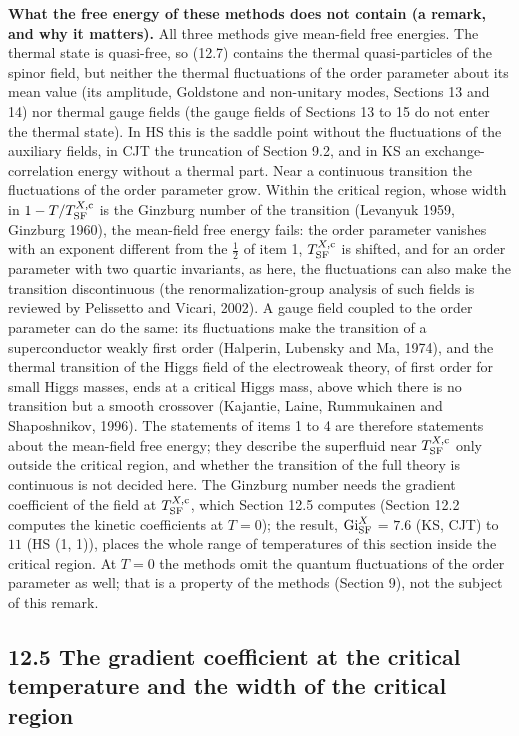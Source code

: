 \documentclass[
  10pt,
]{article}
\begin{document}
\textbf{What the free energy of these methods does not contain (a
remark, and why it matters).} All three methods give mean-field free
energies. The thermal state is quasi-free, so (12.7) contains the
thermal quasi-particles of the spinor field, but neither the thermal
fluctuations of the order parameter about its mean value (its amplitude,
Goldstone and non-unitary modes, Sections 13 and 14) nor thermal gauge
fields (the gauge fields of Sections 13 to 15 do not enter the thermal
state). In HS this is the saddle point without the fluctuations of the
auxiliary fields, in CJT the truncation of Section 9.2, and in KS an
exchange-correlation energy without a thermal part. Near a continuous
transition the fluctuations of the order parameter grow. Within the
critical region, whose width in \(1-T/T^{X,{\rm c}}_{\rm SF}\) is the
Ginzburg number of the transition (Levanyuk 1959, Ginzburg 1960), the
mean-field free energy fails: the order parameter vanishes with an
exponent different from the \(\tfrac12\) of item 1,
\(T^{X,{\rm c}}_{\rm SF}\) is shifted, and for an order parameter with
two quartic invariants, as here, the fluctuations can also make the
transition discontinuous (the renormalization-group analysis of such
fields is reviewed by Pelissetto and Vicari, 2002). A gauge field
coupled to the order parameter can do the same: its fluctuations make
the transition of a superconductor weakly first order (Halperin,
Lubensky and Ma, 1974), and the thermal transition of the Higgs field of
the electroweak theory, of first order for small Higgs masses, ends at a
critical Higgs mass, above which there is no transition but a smooth
crossover (Kajantie, Laine, Rummukainen and Shaposhnikov, 1996). The
statements of items 1 to 4 are therefore statements about the mean-field
free energy; they describe the superfluid near
\(T^{X,{\rm c}}_{\rm SF}\) only outside the critical region, and whether
the transition of the full theory is continuous is not decided here. The
Ginzburg number needs the gradient coefficient of the field at
\(T^{X,{\rm c}}_{\rm SF}\), which Section 12.5 computes (Section 12.2
computes the kinetic coefficients at \(T=0\)); the result,
\({\rm Gi}^{X}_{\rm SF}\) = \(7.6\) (KS, CJT) to \(11\) (HS (1, 1)),
places the whole range of temperatures of this section inside the
critical region. At \(T=0\) the methods omit the quantum fluctuations of
the order parameter as well; that is a property of the methods (Section
9), not the subject of this remark.

\hypertarget{the-gradient-coefficient-at-the-critical-temperature-and-the-width-of-the-critical-region}{%
\subsection{12.5 The gradient coefficient at the critical temperature
and the width of the critical
region}\label{the-gradient-coefficient-at-the-critical-temperature-and-the-width-of-the-critical-region}}
\end{document}
